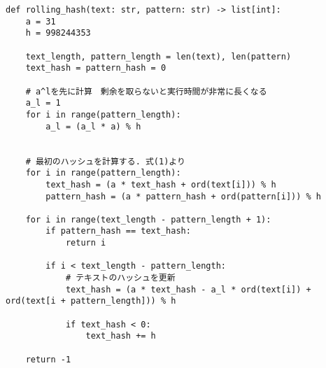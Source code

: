 \documentclass{jlreq}
\begin{document}
\begin{lstlisting}[caption=ラビン・カープ法の実装, frame=TRBL, label={Rabin-Karp}]
def rolling_hash(text: str, pattern: str) -> list[int]:
    a = 31
    h = 998244353
    
    text_length, pattern_length = len(text), len(pattern)
    text_hash = pattern_hash = 0
    
    # a^lを先に計算　剰余を取らないと実行時間が非常に長くなる
    a_l = 1
    for i in range(pattern_length):
        a_l = (a_l * a) % h
    
    
    # 最初のハッシュを計算する. 式(1)より
    for i in range(pattern_length):
        text_hash = (a * text_hash + ord(text[i])) % h
        pattern_hash = (a * pattern_hash + ord(pattern[i])) % h
    
    for i in range(text_length - pattern_length + 1):
        if pattern_hash == text_hash:
            return i
        
        if i < text_length - pattern_length:
            # テキストのハッシュを更新
            text_hash = (a * text_hash - a_l * ord(text[i]) + ord(text[i + pattern_length])) % h
        
            if text_hash < 0:
                text_hash += h
    
    return -1
\end{lstlisting}
\end{document}
